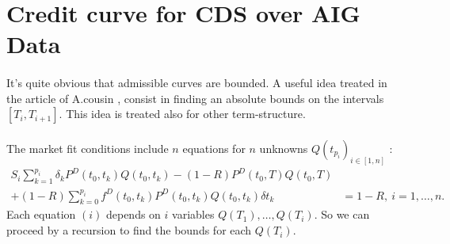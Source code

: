 \section{Credit curve for CDS over AIG Data}
\label{sec:credit-curve-cds}

\paragraph{}
It's quite obvious that admissible curves  are bounded. A useful idea treated in
the article of A.cousin \cite{OTRATS}, consist  in finding an absolute bounds on
the   intervals  $[T_i,T_{i+1}]$.   This  idea   is  treated   also  for   other
term-structure.\\

\paragraph{}
The market fit conditions include $n$ equations for $n$ unknowns $Q(t_{p_i})_{i\in[1,n]}$ :
\begin{eqnarray*}
  \label{eq:bornes:1}
  S_i \sum^{p_i}_{k=1}\delta_kP^D(t_0,t_k)Q(t_0,t_k) - (1 -
  R)P^D(t_0,T)Q(t_0,T) & \\
  + (1 - R)\sum^{p_i}_{k=0}f^D(t_0,t_k)P^D(t_0,t_k)Q(t_0,t_k)\delta t_k & = 1 - R,\ i=1,\dots,n.
\end{eqnarray*}
Each equation $(i)$ depends on $i$  variables $Q(T_1),\dots,Q(T_{i})$. So we can proceed by
a recursion to find the bounds for each $Q(T_{i})$. \\

